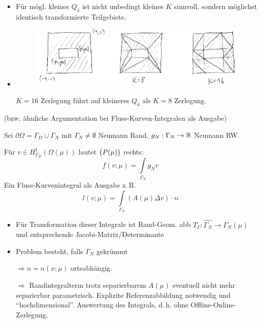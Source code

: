 \begin{bem}
\begin{itemize}
		\item Für mögl. kleines $Q_{\hat{a}}$ ist nicht unbedingt kleines $K$ sinnvoll, sondern möglichst identisch transformierte Teilgebiete.
		\item
			\begin{figure}[H]
				\centering\small
				\includegraphics[width = 0.75 \textwidth]{Bilder/affine-trafo-komponenten.png}
			\end{figure}
			$K=16$ Zerlegung führt auf kleineres $Q_{\hat{a}}$ als $K=8$ Zerlegung.
	\end{itemize}
\end{bem}

\begin{bem}
(bzw. ähnliche Argumentation bei Fluss-Kurven-Integralen als Ausgabe)

Sei $\partial \Omega = \Gamma_D \cup \Gamma_N$ mit $\Gamma_N \neq \emptyset$ Neumann Rand, $g_N: \Gamma_N \rightarrow \mathbb{R}$ Neumann RW.

Für $v \in H_{\Gamma_D}^1 (\Omega(\mu))$ lautet $\big(P(\mu)\big)$ rechts:
\[
	f(v;\mu) = \int\limits_{\Gamma_N} g_N v
\]
Ein Fluss-Kurvenintegral als Ausgabe z.\,B.
\[
	l(v;\mu) = \int\limits_{\Gamma_N} (A(\mu) \Delta v)\cdot n
\]
\begin{itemize}
	\item Für  Transformation dieser Integrale ist Rand-Geom. abb $T_{\Gamma} : \hat{\Gamma_N} \rightarrow \Gamma_N (\mu)$ und entsprechende Jacobi-Matrix/Determinante
	\item Problem besteht, falls $\Gamma_N$ gekrümmt
		
		$\Rightarrow n=n(x;\mu)$ ortsabhängig.
		
		$\Rightarrow$ Randintegralterm trotz separierbarem $A(\mu)$ eventuell nicht mehr separierbar parametrisch. Explizite Referenzabbildung notwendig und ``hochdimensional''. Auswertung des Integrals, d.\,h. ohne Offline-Online-Zerlegung.
\end{itemize}
\end{bem}

